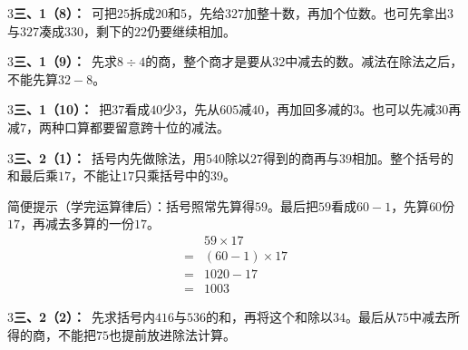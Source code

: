 \documentclass[multi=snippet,border={5bp 20bp 5bp 5bp}]{standalone}
\newenvironment{snippet}[3]{\begin{minipage}{#1bp}\color{answerred}\fontsize{#2}{#3}\selectfont\raggedright}{\end{minipage}}
\begin{document}
\begin{snippet}{505}{11.5}{14}\begin{multicols}{3}\raggedcolumns \textbf{三、1（8）：}\ 可把\(25\)\allowbreak 拆成\(20\)\allowbreak 和\(5\)\allowbreak ，先给\(327\)\allowbreak 加整十数，再加个位数。也可先拿出\(3\)\allowbreak 与\(327\)\allowbreak 凑成\(330\)\allowbreak ，剩下的\(22\)\allowbreak 仍要继续相加。\end{multicols}\end{snippet}
\begin{snippet}{505}{11.5}{14}\begin{multicols}{3}\raggedcolumns \textbf{三、1（9）：}\ 先求\(8\div4\)\allowbreak 的商，整个商才是要从\(32\)\allowbreak 中减去的数。减法在除法之后，不能先算\(32-8\)\allowbreak 。\end{multicols}\end{snippet}
\begin{snippet}{505}{11.5}{14}\begin{multicols}{3}\raggedcolumns \textbf{三、1（10）：}\ 把\(37\)\allowbreak 看成\(40\)\allowbreak 少\(3\)\allowbreak ，先从\(605\)\allowbreak 减\(40\)\allowbreak ，再加回多减的\(3\)\allowbreak 。也可以先减\(30\)\allowbreak 再减\(7\)\allowbreak ，两种口算都要留意跨十位的减法。\end{multicols}\end{snippet}
\begin{snippet}{505}{11.5}{14}\begin{multicols}{3}\raggedcolumns \textbf{三、2（1）：}\ 括号内先做除法，用\(540\)\allowbreak 除以\(27\)\allowbreak 得到的商再与\(39\)\allowbreak 相加。整个括号的和最后乘\(17\)\allowbreak ，不能让\(17\)\allowbreak 只乘括号中的\(39\)\allowbreak 。\par 简便提示（学完运算律后）：括号照常先算得\(59\)\allowbreak 。最后把\(59\)\allowbreak 看成\(60-1\)\allowbreak ，先算\(60\)\allowbreak 份\(17\)\allowbreak ，再减去多算的一份\(17\)\allowbreak 。\[\begin{aligned}&59\times17\\={}&(60-1)\times17\\={}&1020-17\\={}&1003\end{aligned}\]\end{multicols}\end{snippet}
\begin{snippet}{505}{11.5}{14}\begin{multicols}{3}\raggedcolumns \textbf{三、2（2）：}\ 先求括号内\(416\)\allowbreak 与\(536\)\allowbreak 的和，再将这个和除以\(34\)\allowbreak 。最后从\(75\)\allowbreak 中减去所得的商，不能把\(75\)\allowbreak 也提前放进除法计算。\end{multicols}\end{snippet}
\end{document}
